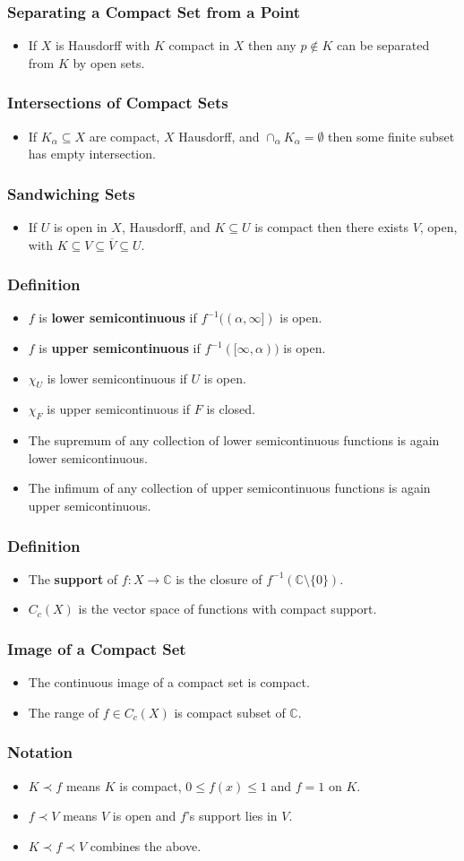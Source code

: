 \documentclass{article}
\newcounter{topicnumber}[section]
\newcommand{\steptopic}[1][1]{\addtocounter{topicnumber}{#1}}
\newenvironment{topic}[1]{%
\steptopic%
\subsubsection{#1}%
\begin{itemize}%
}{%
\end{itemize}%
}
\newcommand{\term}[1]{{\bf #1}}
\newcommand{\remark}{\item}
\begin{document}
\begin{topic}{Separating a Compact Set  from a Point}
\remark If $X$ is Hausdorff with $K$ compact in $X$ then any $p \not\in K$ can be separated from $K$ by open sets.
\end{topic}

\begin{topic}{Intersections of Compact Sets}
\remark If $K_\alpha \subseteq X$ are compact, $X$ Hausdorff, and $\cap_\alpha K_\alpha = \emptyset$ then some finite subset has empty intersection.
\end{topic}

\begin{topic}{Sandwiching Sets}
\remark If $U$ is open in $X$, Hausdorff, and $K \subseteq U$ is compact then there exists $V$, open, with $K \subseteq V \subseteq \overline{V} \subseteq U$.
\end{topic}

\begin{topic}{Definition}
\remark $f$ is \term{lower semicontinuous} if $f^{-1}((\alpha, \infty])$ is open.
\remark $f$ is \term{upper semicontinuous} if $f^{-1}([\infty, \alpha))$ is open.
\remark $\chi_U$ is lower semicontinuous if $U$ is open.
\remark $\chi_F$ is upper semicontinuous if $F$ is closed.
\remark The supremum of any collection of lower semicontinuous functions is again lower semicontinuous.
\remark The infimum of any collection of upper semicontinuous functions is again upper semicontinuous.
\end{topic}

\begin{topic}{Definition}
\remark The \term{support} of $f : X \to \mathbb{C}$ is the closure of $f^{-1}(\mathbb{C} \setminus \{0\})$.
\remark $C_c(X)$ is the vector space of functions with compact support.
\end{topic}

\begin{topic}{Image of a Compact Set}
\remark The continuous image of a compact set is compact.
\remark The range of $f \in C_c(X)$ is compact subset of $\mathbb{C}$.
\end{topic}

\begin{topic}{Notation}
\remark $K \prec f$ means $K$ is compact, $0 \leq f(x) \leq 1$ and $f = 1$ on $K$.
\remark $f \prec V$ means $V$ is open and $f$'s support lies in $V$.
\remark $K \prec f \prec V$ combines the above.
\end{topic}
\end{document}
